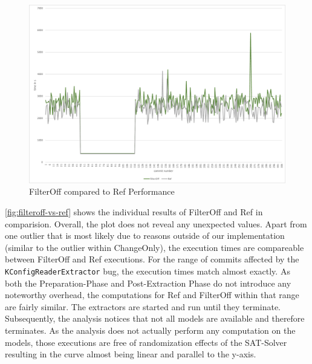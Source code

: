 \documentclass[a4paper]{article}
\begin{document}
\begin{figure}[h] 
  \centering
  \begin{minipage}[b]{1\textwidth} 
    \caption[FilterOff compared to Ref Performance]{FilterOff compared to Ref Performance}\label{fig:filteroff-vs-ref}
    \centering
    \includegraphics[height=1\textwidth, angle=90]{img/filteroff-vs-ref.pdf}
  \end{minipage}
\end{figure}


\autoref{fig:filteroff-vs-ref} shows the individual results of FilterOff and Ref in comparision. Overall, the plot does not reveal any unexpected values. Apart from one outlier that is most likely due to reasons outside of our implementation (similar to the outlier within ChangeOnly), the execution times are compareable between FilterOff and Ref executions. For the range of commits affected by the \texttt{KConfigReaderExtractor} bug, the execution times match almost exactly. As both the Preparation-Phase and Post-Extraction Phase do not introduce any noteworthy overhead, the computations for Ref and FilterOff within that range are fairly similar. The extractors are started and run until they terminate. Subsequently, the analysis notices that not all models are available and therefore terminates. As the analysis does not actually perform any computation on the models, those executions are free of randomization effects of the SAT-Solver resulting in the curve almost being linear and parallel to the y-axis.
\end{document}
